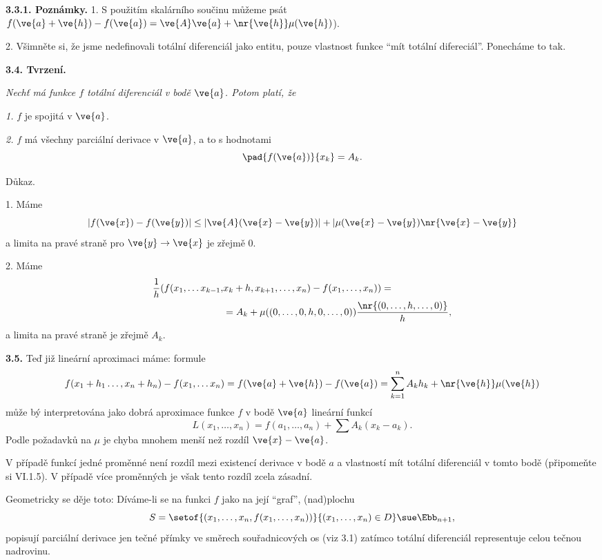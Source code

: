 \documentclass[12pt]{article}
\begin{document}
{\medskip

{\bf 3.3.1. Poznámky.} 1. S použitím skalárního součinu
můžeme psát $f(\ve{a}+\ve{h})-f(\ve{a})=\ve{A}\ve{a}+\nr{\ve{h}}\mu(\ve{h})$).

2. Všimněte si, že jsme nedefinovali totální diferenciál jako entitu, pouze vlastnost funkce ``mít totální difereciál''. Ponecháme to tak.

\bigskip

{\bf 3.4. Tvrzení.} {\em Nechť má funkce
$f$ totální diferenciál v bodě $\ve{a}$. Potom platí, že

{\em 1.} $f$ je spojitá v $\ve{a}$.

{\em 2.} $f$ má všechny parciální derivace v $\ve{a}$, a to s hodnotami
$$
\pad{f(\ve{a})}{x_k}=A_k.
$$

Důkaz.} 1. Máme
$$
|f(\ve{x})-f(\ve{y})|\leq |\ve{A}(\ve{x}-\ve{y})|+|\mu(\ve{x}-\ve{y})\nr{\ve{x}-\ve{y}}
$$
a limita na pravé straně pro $\ve{y}\to\ve{x}$ je zřejmě 0.

2. M\'ame
$$
\begin{aligned}
\frac1h(f(x_1,\dots x_{k-1},&x_k+h,x_{k+1},\dots,x_n)-f(x_1,\dots,x_n))=\\
&=A_k +\mu((0,\dots,0,h,0,\dots,0))\frac{\nr{(0,\dots,h,\dots,0)}}{h},
\end{aligned}
$$
a limita na pravé straně je zřejmě $A_k$. \sq

\bigskip

{\bf 3.5.} Teď již lineární aproximaci máme: formule
$$
f(x_1+h_1\dots,x_n+h_n)-f(x_1,\dots x_n)=f(\ve{a}+\ve{h})-f(\ve{a})=
\sum_{k=1}^nA_kh_k+\nr{\ve{h}}\mu(\ve{h})
 $$ 
může bý interpretována jako dobrá aproximace funkce $f$ v bodě
$\ve{a}$ lineární funkcí
$$L(x_1,\dots,x_n)= f(a_1,\dots,a_n)+\sum A_k(x_k-a_k).$$ 
Podle požadavků na
 $\mu$ je chyba  mnohem menší než rozdíl $\ve{x}-\ve{a}$.

\smallskip

V případě funkcí jedné proměnné 
není rozdíl mezi existencí derivace v bodě  $a$ a 
vlastností mít totální diferenciál
v tomto bodě (připomeňte si VI.1.5). 
V případě více proměnných je však tento rozdíl zcela zásadní.


Geometricky se děje toto: 
Díváme-li se na funkci $f$ jako na její ``graf'',  (nad)plochu
$$
S=\setof{(x_1,\dots,x_n,f(x_1,\dots,x_n))}{(x_1,\dots,x_n)\in D}\sue\Ebb_{n+1}, 
$$
popisují parciální derivace jen tečné přímky ve směrech souřadnicových os (viz 3.1) zatímco totální diferenciál representuje celou tečnou nadrovinu.

\bigskip

}
\end{document}

